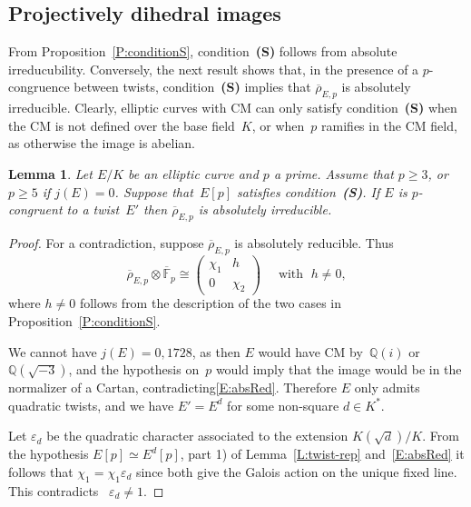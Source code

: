 \documentclass[12pt, reqno]{amsart}
\newcommand{\F}{\mathbb{F}}
\newcommand{\Fbar}{{\overline{\F}}}
\newcommand{\Q}{\mathbb{Q}}
\newcommand{\rhobar}{{\overline{\rho}}}
\newcommand{\eps}{\varepsilon}
\numberwithin{equation}{section}
\newtheorem{lemma}[theorem]{Lemma}
\theoremstyle{definition}
\theoremstyle{remark}
\begin{document}
\subsection{Projectively dihedral images}
From Proposition~\ref{P:conditionS}, condition~{\bf (S)} follows from
absolute irreducubility.  Conversely, the next result shows that, in
the presence of a $p$-congruence between twists, condition~{\bf (S)}
implies that $\rhobar_{E,p}$ is absolutely irreducible.  Clearly,
elliptic curves with CM can only satisfy condition~{\bf (S)} when the
CM is not defined over the base field~$K$, or when~$p$ ramifies in the
CM field, as otherwise the image is abelian.

\begin{lemma} \label{L:noCyclic}
Let $E/K$ be an elliptic curve and $p$ a prime. Assume that $p\geq 3$,
or $p\geq5$ if $j(E)=0$.  Suppose that~$E[p]$ satisfies
condition~{\bf (S)}.  If $E$ is $p$-congruent to a twist~$E'$ then
$\rhobar_{E,p}$ is absolutely irreducible.
\end{lemma}
\begin{proof}
For a contradiction, suppose $\rhobar_{E,p}$ is absolutely reducible. Thus
\begin{equation} \label{E:absRed}
  \rhobar_{E,p} \otimes \Fbar_p \cong 
 \begin{pmatrix}
 \chi_1 & h \\ 0 &\chi_2
 \end{pmatrix} \quad \text{ with } \; h \neq 0, 
\end{equation} 
where $h \neq 0$ follows from 
the description of the two cases
in Proposition~\ref{P:conditionS}.

We cannot have $j(E) = 0, 1728$, as then $E$ would have CM by~$\Q(i)$
or $\Q(\sqrt{-3})$, and the hypothesis on~$p$ would imply that the
image would be in the normalizer of a Cartan,
contradicting\eqref{E:absRed}. Therefore $E$ only admits quadratic
twists, and we have $E' = E^d$ for some non-square $d \in K^*$.

Let $\eps_d$ be the quadratic character associated to the extension
$K(\sqrt{d})/K$. From the hypothesis $E[p] \simeq E^d[p]$, part 1) of
Lemma~\ref{L:twist-rep} and~\eqref{E:absRed} it follows that $\chi_1
=\chi_1\eps_d$ since both give the Galois action on the unique fixed
line. This contradicts ~$\eps_d \neq 1$.
\end{proof}
\end{document}

